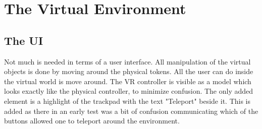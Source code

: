 \section{The Virtual Environment}

\subsection{The UI}
Not much is needed in terms of a user interface. All manipulation of the virtual objects is done by moving around the physical tokens. All the user can do inside the virtual world is move around. The VR controller is visible as a model which looks exactly like the physical controller, to minimize confusion. The only added element is a highlight of the trackpad with the text "Teleport" beside it. This is added as there in an early test was a bit of confusion communicating which of the buttons allowed one to teleport around the environment.

